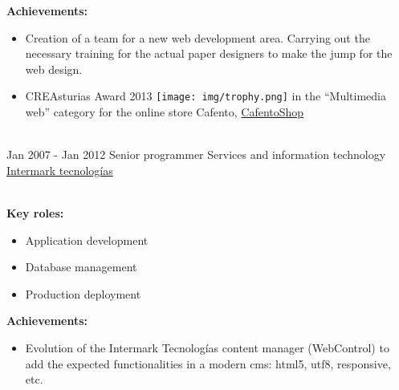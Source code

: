 \documentclass[letterpaper]{twentysecondcv} %
\begin{document}
\begin{twenty}
{		\textbf{Achievements:}
		\begin{itemize}
			\item Creation of a team for a new web development area. Carrying out the necessary training for the actual paper designers to make the jump for the web design.
			\item CREAsturias Award 2013 {\texttt{[image: img/trophy.png]}} in the ``Multimedia web'' category for the online store Cafento, \href{https://www.cafentoshop.com/}{CafentoShop}
		\end{itemize}
	}
	\\
	\twentyitem%
	{Jan 2007 -}
	{Jan 2012}
	{Senior programmer}
	{Services and information technology}
	{\href{http://www.intermarktecnologias.com/}{Intermark tecnologías}}
	{\\
		\textbf{Key roles:}
		\begin{itemize}
			\item Application development
			\item Database management
			\item Production deployment
		\end{itemize}

		\textbf{Achievements:}
		\begin{itemize}
			\item Evolution of the Intermark Tecnologías content manager (WebControl) to add the expected functionalities in a modern cms: html5, utf8, responsive, etc.
		\end{itemize}
	}

\end{twenty}
\end{document}
